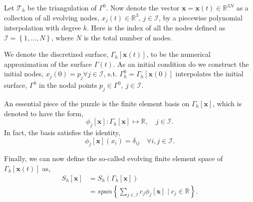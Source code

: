 Let $\mathcal{T}_{h}  $ be the triangulation of $\Gamma ^{0}$. Now denote the vector $ \mathbf{x} = \mathbf{x} \left( t \right)  \in \mathbb{R} ^{3N}$ as a collection of all evolving nodes, $x_{j}\left( t \right)  \in  \mathbb{R} ^3$, $j \in  \mathcal{I} $, by a piecewise polynomial interpolation
with degree $k$. Here is the index of all the nodes defined as $\mathcal{I} =\left\{ 1, \ldots, N \right\}  $, where $N$ is the total number of nodes.

We denote the discretized surface, $\Gamma _{h} \left[ \mathbf{x}\left( t \right)  \right] $, to be the numerical approximation of the surface $\Gamma \left( t \right) $. As an initial condition do we construct the initial nodes, $
 x_{j}( 0 )  = p_{j} \forall j \in  \mathcal{I}  $, s.t.
 $\Gamma _{h}^{0  } = \Gamma _{h} \left[ \mathbf{x}\left( 0 \right)   \right] $ interpolates the initial surface, $\Gamma ^{0}$ in the nodal points $p_{j} \in \Gamma ^{0}, \  j \in  \mathcal{I} $.

An essential piece of the puzzle is the finite element basis on $\Gamma _{h}\left[ \mathbf{x} \right] $, which is denoted to have the form,
\[
 \phi_{j} \left[ \mathbf{x} \right]: \Gamma_{h}\left[ \mathbf{x} \right] \mapsto \mathbb{R} , \quad   j \in  \mathcal{I} .
\]
In fact, the basis satisfies the identity,
\[
\phi _{j} \left[ \mathbf{x} \right] \left( x_{i} \right)  = \delta _{ij} \quad \forall i,j \in  \mathcal{I} .
\]

Finally, we can now define the so-called evolving finite element space of $\Gamma _{h}\left[ \mathbf{x}\left( t \right)  \right] $ as,
\[
    \begin{split}
S_{h}\left[ \mathbf{x} \right]   & = S_{h}\left( \Gamma _{h}\left[ \mathbf{x} \right]  \right) \\
 & = span\left\{ \sum_{j \in  \mathcal{I}  }^{}  c_{j} \phi _{j}\left[ \mathbf{x} \right]  \mid  c_{j} \in \mathbb{R}   \right\}.
    \end{split}
\]

